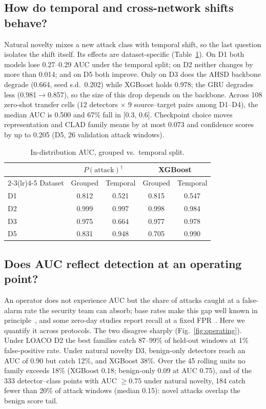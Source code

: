 \documentclass[conference]{IEEEtran}
\newif\ifappendix
\begin{document}
\subsection{How do temporal and cross-network shifts behave?}
\label{sec:c5}
Natural novelty mixes a new attack class with temporal shift, so the last question isolates the shift itself. Its effects are dataset-specific (Table~\ref{tab:temp}). On D1 both models lose 0.27--0.29 AUC under the temporal split; on D2 neither changes by more than 0.014; and on D5 both improve. Only on D3 does the AHSD backbone degrade (0.664, seed s.d.\ 0.202) while XGBoost holds 0.978; the GRU degrades less (0.981$\rightarrow$0.857), so the size of this drop depends on the backbone. Across 108 zero-shot transfer cells (12 detectors $\times$ 9 source--target pairs among D1--D4), the median AUC is 0.500 and 67\% fall in [0.3, 0.6]\ifappendix\ (Table~\ref{tab:a_transfer})\fi. Checkpoint choice moves representation and CLAD family means by at most 0.073 and confidence scores by up to 0.205 (D5, 26 validation attack windows).

\begin{table}[!t]
\centering\footnotesize\setlength{\tabcolsep}{4pt}
\caption{In-distribution AUC, grouped vs.\ temporal split.}
\label{tab:temp}
\begin{tabular}{lcccc}
\toprule
 & \multicolumn{2}{c}{$P(\text{attack})^\dagger$} & \multicolumn{2}{c}{XGBoost}\\
\cmidrule(lr){2-3}\cmidrule(lr){4-5}
Dataset & Grouped & Temporal & Grouped & Temporal\\
\midrule
D1 & 0.812 & 0.521 & 0.815 & 0.547\\
D2 & 0.999 & 0.997 & 0.998 & 0.984\\
D3 & 0.975 & 0.664 & 0.977 & 0.978\\
D5 & 0.831 & 0.948 & 0.705 & 0.990\\
\bottomrule
\end{tabular}
\end{table}

\subsection{Does AUC reflect detection at an operating point?}
\label{sec:c6}
An operator does not experience AUC but the share of attacks caught at a false-alarm rate the security team can absorb; base rates make this gap well known in principle~\cite{arp2022,apruzzese2023sok}, and some zero-day studies report recall at a fixed FPR~\cite{nayak2026,mesca2026}. Here we quantify it across protocols. The two disagree sharply (Fig.~\ref{fig:operating}). Under LOACO D2 the best families catch 87--99\% of held-out windows at 1\% false-positive rate. Under natural novelty D3, benign-only detectors reach an AUC of 0.90 but catch 12\%, and XGBoost 38\%. Over the 45 rolling units no family exceeds 18\% (XGBoost 0.18; benign-only 0.09 at AUC 0.75), and of the 333 detector--class points with AUC $\geq0.75$ under natural novelty, 184 catch fewer than 20\% of attack windows (median 0.15): novel attacks overlap the benign score tail.
\end{document}
